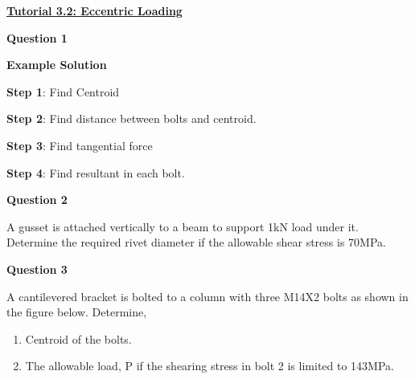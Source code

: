 \documentclass[a4paper, fleqn]{article}
\begin{document}
\underline{\textbf{Tutorial 3.2: Eccentric Loading}}
\vspace{10pt}

\textbf{Question 1}

\vspace{10pt}
\textbf{Example Solution}
\vspace{10pt}

\textbf{Step 1}: Find Centroid

\textbf{Step 2}: Find distance between bolts and centroid.

\textbf{Step 3}: Find tangential force

\textbf{Step 4}: Find resultant in each bolt.







\textbf{Question 2}

A gusset is attached vertically to a beam to support 1kN load under it. Determine the required rivet diameter if the allowable shear stress is 70MPa.


\textbf{Question 3}

A cantilevered bracket is bolted to a column with three M14X2 bolts as shown in the figure below. Determine,

\begin{enumerate}[label=(\roman*)]
    \item Centroid of the bolts.
    \item The allowable load, P if the shearing stress in bolt 2 is limited to 143MPa.
\end{enumerate}


\end{document}
